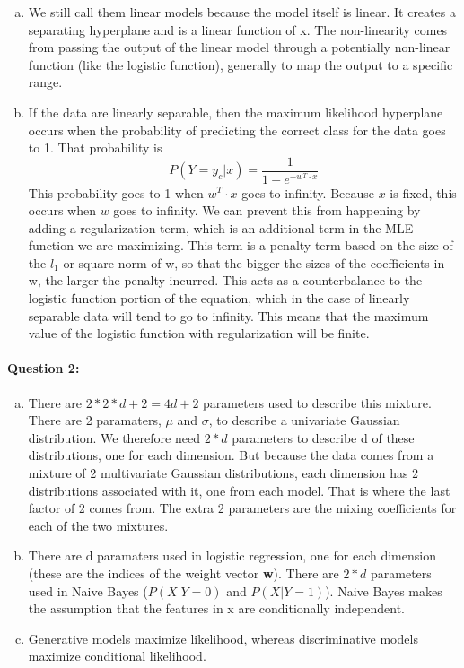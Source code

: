 \documentclass[letterpaper,11pt]{article}
\begin{document}
\begin{enumerate}[(a)]
\item
 We still call them linear models because the model itself is linear. It creates a separating hyperplane
and is a linear function of x. The non-linearity comes from passing the output of the linear model through
a potentially non-linear function (like the logistic function), generally to map the output to a specific range.
\item
If the data are linearly separable, then the maximum likelihood hyperplane occurs when the probability of
predicting the correct class for the data goes to 1. That probability is 
\begin{equation}
  P(Y=y_{c} | x) = \frac{1}{1 + e^{-w^T \cdot x}}
\end{equation}
This probability goes to 1 when $w^T \cdot x$ goes to infinity. Because $x$ is fixed, this occurs when
$w$ goes to infinity. We can prevent this from happening by adding a regularization term, which is an additional
term in the MLE function we are maximizing. This term is a penalty term based on the size of the $l_1$ or square norm
of w, so that the bigger the sizes of the coefficients in w, the larger the penalty incurred. This acts as a
counterbalance to the logistic function portion of the equation, which in the case of linearly separable
data will tend to go to infinity. This means that the maximum value of the logistic function with
regularization will be finite.
\end{enumerate}

\paragraph{Question 2:}
\begin{enumerate}[(a)]
\item
There are $2*2*d + 2 = 4d + 2$ parameters used to describe this mixture. There are 2 paramaters, $\mu$ and $\sigma$,
to describe a univariate Gaussian distribution. We therefore need $2*d$ parameters to describe d of these
distributions, one for each dimension. But because the data comes from a mixture of 2 multivariate Gaussian
distributions, each dimension has 2 distributions associated with it, one from each model. That is where the last
factor of 2 comes from. The extra 2 parameters are the mixing coefficients for each of the two mixtures.
\item
There are d paramaters used in logistic regression, one for each dimension (these are the indices of the weight vector \textbf{w}).
There are $2*d$ parameters used in Naive Bayes ($P(X|Y = 0)$ and $P(X|Y = 1)$). Naive Bayes makes the assumption that the
features in x are conditionally independent.
\item
Generative models maximize likelihood, whereas discriminative models maximize conditional likelihood.
\end{enumerate}
\end{document}
